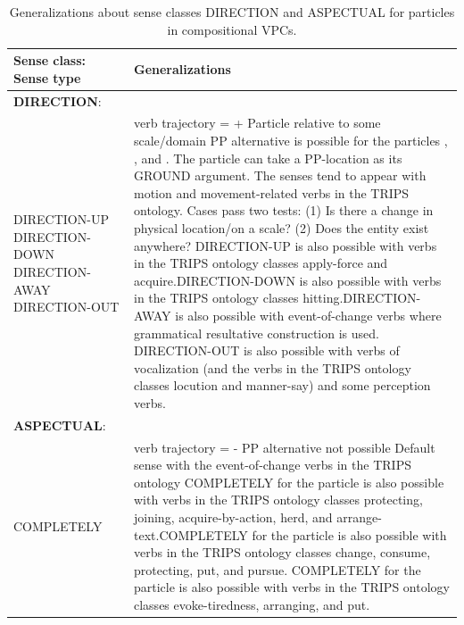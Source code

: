 \documentclass[output=paper,modfonts,nonflat]{langsci/langscibook}
\begin{document}
\begin{table}
\caption{Generalizations about sense classes DIRECTION and ASPECTUAL for particles in compositional VPCs. }
\label{tab:1:findings-prtcls-sense-classes}
\footnotesize
 \begin{tabularx}{\textwidth}{p{30mm}Q}
  \lsptoprule
   \textbf{Sense class}: \newline Sense type
        & Generalizations\\
    \midrule
  \textbf{DIRECTION}: \\
  \midrule
   DIRECTION-UP \newline DIRECTION-DOWN \newline DIRECTION-AWAY \newline DIRECTION-OUT
    & verb trajectory = + \newline Particle relative to some scale/domain \newline PP alternative is possible for the particles , , and . \newline The particle  can take a PP-location as its GROUND argument. \newline The senses tend to appear with motion and movement-related verbs in the TRIPS ontology. \newline Cases pass two tests: (1) Is there a change in physical location/on a scale? (2) Does the entity exist anywhere? \newline DIRECTION-UP is also possible with verbs in the TRIPS ontology classes apply-force and acquire.\newline DIRECTION-DOWN is also possible with verbs in the TRIPS ontology classes hitting.\newline DIRECTION-AWAY is also possible with event-of-change verbs where grammatical resultative construction is used. \newline DIRECTION-OUT is also possible with verbs of vocalization (and the verbs in the TRIPS ontology classes locution and manner-say) and some perception verbs. \\
  \textbf{ASPECTUAL}: \\ 
  \midrule
   COMPLETELY
    & verb trajectory = - \newline PP alternative not possible \newline Default sense with the event-of-change verbs in the TRIPS ontology \newline COMPLETELY for the particle  is also possible with verbs in the TRIPS ontology classes protecting, joining, acquire-by-action, herd, and arrange-text.\newline COMPLETELY for the particle  is also possible with verbs in the TRIPS ontology classes change, consume, protecting, put, and pursue. \newline COMPLETELY for the particle  is also possible with verbs in the TRIPS ontology classes evoke-tiredness, arranging, and put.\\

\end{tabularx}
\end{table}
\end{document}
